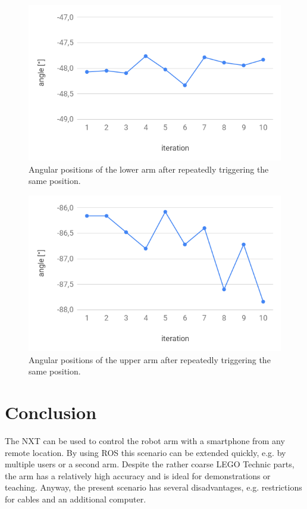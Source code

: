 \documentclass[conference]{IEEEtran}
\begin{document}
\begin{figure}[htbp]
	\centerline{\includegraphics[scale=0.3]{img/angle_lower.png}}
	\caption{Angular positions of the lower arm after repeatedly triggering the same position.}
	\label{fig:lowerjointprecision}
\end{figure}

\begin{figure}[htbp]
	\centerline{\includegraphics[scale=0.3]{img/angle_upper.png}}
	\caption{Angular positions of the upper arm after repeatedly triggering the same position.}
	\label{fig:upperjointprecision}
\end{figure}

\section{Conclusion}
The NXT can be used to control the robot arm with a smartphone from any remote location. By using ROS this scenario can be extended quickly, e.g. by multiple users or a second arm. Despite the rather coarse LEGO Technic parts, the arm has a relatively high accuracy and is ideal for demonstrations or teaching. Anyway, the present scenario has several disadvantages, e.g. restrictions for cables and an additional computer.
\end{document}
